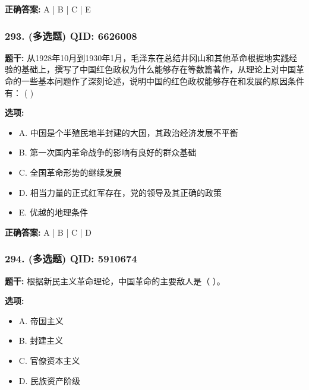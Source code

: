 \documentclass[12pt,UTF8]{ctexart}
\begin{document}
\textbf{正确答案:}
A | B | C | E

\vspace{0.3em}\hrulefill\vspace{0.7em}

\subsubsection*{293. (多选题) \small QID: 6626008}

\textbf{题干:}
从1928年10月到1930年1月，毛泽东在总结井冈山和其他革命根据地实践经验的基础上，撰写了中国红色政权为什么能够存在等数篇著作，从理论上对中国革命的一些基本问题作了深刻论述，说明中国的红色政权能够存在和发展的原因条件有： ( )

\textbf{选项:}
\begin{itemize}[leftmargin=*]

  \item A. 中国是个半殖民地半封建的大国，其政治经济发展不平衡

  \item B. 第一次国内革命战争的影响有良好的群众基础

  \item C. 全国革命形势的继续发展

  \item D. 相当力量的正式红军存在，党的领导及其正确的政策

  \item E. 优越的地理条件

\end{itemize}

\textbf{正确答案:}
A | B | C | D

\vspace{0.3em}\hrulefill\vspace{0.7em}

\subsubsection*{294. (多选题) \small QID: 5910674}

\textbf{题干:}
根据新民主义革命理论，中国革命的主要敌人是（ ）。

\textbf{选项:}
\begin{itemize}[leftmargin=*]

  \item A. 帝国主义

  \item B. 封建主义

  \item C. 官僚资本主义

  \item D. 民族资产阶级

\end{itemize}
\end{document}
